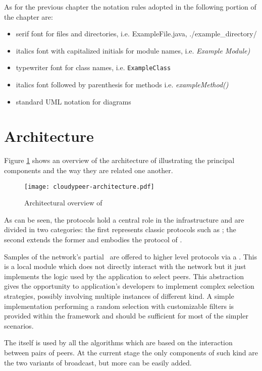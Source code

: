 As for the previous chapter the notation rules adopted in the
following portion of the chapter are:
\begin{itemize}
  \item serif font for files and directories, i.e. \textsf{ExampleFile.java},
    \textsf{./example\_directory/}
  \item italics font with capitalized initials for module names,
    i.e. \textit{Example Module)}
 \item typewriter font for class names, i.e. \texttt{ExampleClass}
  \item italics font followed by parenthesis for methods
    i.e. \textit{exampleMethod()}
  \item standard UML notation for diagrams
\end{itemize}

\section{Architecture}
Figure \ref{fig:cloudypeer-architecture} shows an overview of the
architecture of \cloudypeer illustrating the principal components and
the way they are related one another.

\begin{figure}[h!]
  \centering
  \texttt{[image: cloudypeer-architecture.pdf]}
  \caption{Architectural overview of \cloudypeer}
  \label{fig:cloudypeer-architecture}
\end{figure}

As can be seen, the \peersampling protocols hold a central role in the
infrastructure and are divided in two categories: the first represents
classic protocols such as \cyclon; the second extends the former and
embodies the \peersampling protocol of \cloudcast.

Samples of the network's partial \view\ are offered to higher level
protocols via a \peerselector. This is a local module which does not
directly interact with the \ptop network but it just implements the logic
used by the application to select peers. This abstraction gives the
opportunity to application's developers to implement complex selection
strategies, possibly involving multiple \peersampling instances of
different kind. A simple implementation performing a random
selection with customizable filters is provided within the framework
and should be sufficient for most of the simpler scenarios.

The \peerselector itself is used by all the algorithms which are
based on the interaction between pairs of peers. At the current stage
the only components of such kind are the two variants of \epidemic
broadcast, but more can be easily added.

